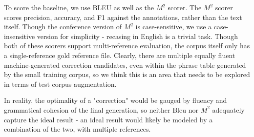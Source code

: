 \documentclass[11pt,letterpaper]{article}
\begin{document}
To score the baseline, we use BLEU as well as the $M^2$ scorer. The $M^2$ scorer scores precision, accuracy, and F1 against the annotations, rather than the text itself. Though the conference version of $M^2$ is case-sensitive, we use a case-insensitive version for simplicity - recasing in English is a trivial task. Though both of these scorers support multi-reference evaluation, the corpus itself only has a single-reference gold reference file. Clearly, there are multiple equally fluent machine-generated correction candidates, even within the phrase table generated by the small training corpus, so we think this is an area that needs to be explored in terms of test corpus augmentation.

In reality, the optimality of a "correction" would be gauged by fluency and grammatical cohesion of the final generation, so neither Bleu nor $M^2$ adequately capture the ideal result - an ideal result would likely be modeled by a combination of the two, with multiple references. 
\end{document}
